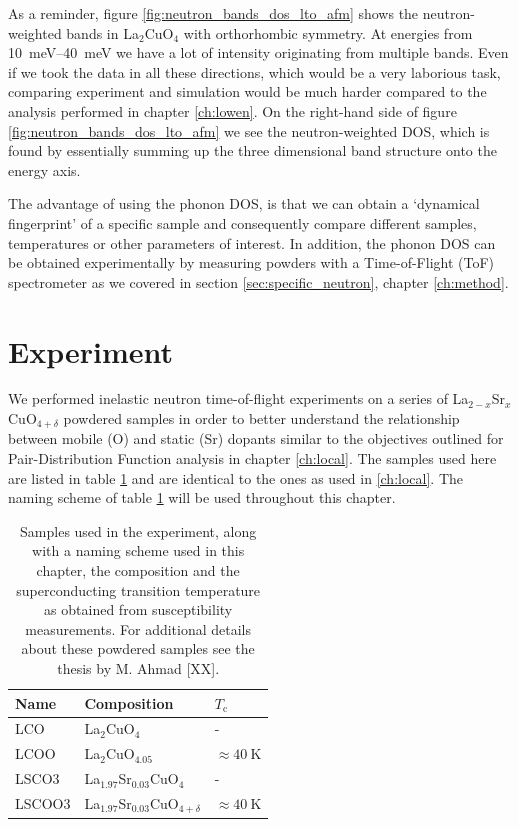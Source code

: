 As a reminder, figure \ref{fig:neutron_bands_dos_lto_afm} shows the neutron-weighted bands in La$_2$CuO$_4$ with orthorhombic symmetry. At energies from \SIrange{10}{40}{\milli\eV} we have a lot of intensity originating from multiple bands. Even if we took the data in all these directions, which would be a very laborious task, comparing experiment and simulation would be much harder compared to the analysis performed in chapter \ref{ch:lowen}. On the right-hand side of figure \ref{fig:neutron_bands_dos_lto_afm} we see the neutron-weighted DOS, which is found by essentially summing up the three dimensional band structure onto the energy axis.

The advantage of using the phonon DOS, is that we can obtain a `dynamical fingerprint' of a specific sample and consequently compare different samples, temperatures or other parameters of interest. In addition, the phonon DOS can be obtained experimentally by measuring powders with a Time-of-Flight (ToF) spectrometer as we covered in section \ref{sec:specific_neutron}, chapter \ref{ch:method}.

\section{Experiment}
We performed inelastic neutron time-of-flight experiments on a series of La$_{2-x}$Sr$_{x}$CuO$_{4+\delta}$ powdered samples in order to better understand the relationship between mobile (O) and static (Sr) dopants similar to the objectives outlined for Pair-Distribution Function analysis in chapter \ref{ch:local}. The samples used here are listed in table \ref{tab:in4_samples} and are identical to the ones as used in \ref{ch:local}. The naming scheme of table \ref{tab:in4_samples} will be used throughout this chapter.

\begin{table}
    \caption{Samples used in the experiment, along with a naming scheme used in this chapter, the composition and the superconducting transition temperature as obtained from susceptibility measurements. For additional details about these powdered samples see the thesis by M. Ahmad [XX].}
    \label{tab:in4_samples}
    \centering
    \begin{tabular}{lll}
    \toprule
      Name &                             Composition &                $T_\text{c}$ \\
    \midrule
       LCO &                           La$_2$CuO$_4$ &                           - \\
      LCOO &                      La$_2$CuO$_{4.05}$ &  $\approx \SI{40}{\kelvin}$ \\
     LSCO3 &           La$_{1.97}$Sr$_{0.03}$CuO$_4$ &                           - \\
     LSCOO3 &  La$_{1.97}$Sr$_{0.03}$CuO$_{4+\delta}$ &  $\approx \SI{40}{\kelvin}$ \\
    \bottomrule
    \end{tabular}
\end{table}

